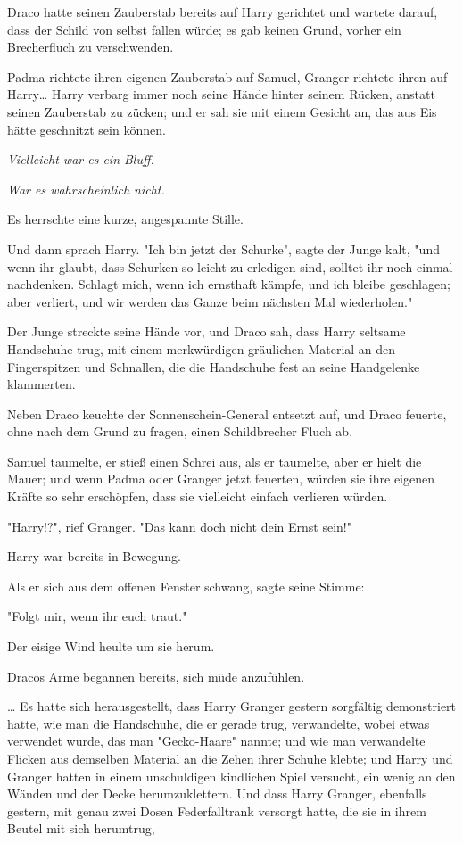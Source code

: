 {Draco hatte seinen Zauberstab bereits auf Harry gerichtet und wartete darauf, dass der Schild von selbst fallen würde; es gab keinen Grund, vorher ein Brecherfluch zu verschwenden.

Padma richtete ihren eigenen Zauberstab auf Samuel, Granger richtete ihren auf Harry… Harry verbarg immer noch seine Hände hinter seinem Rücken, anstatt seinen Zauberstab zu zücken; und er sah sie mit einem Gesicht an, das aus Eis hätte geschnitzt sein können.

\emph{Vielleicht war es ein Bluff.}

\emph{War es wahrscheinlich nicht.}

Es herrschte eine kurze, angespannte Stille.

Und dann sprach Harry. "Ich bin jetzt der Schurke", sagte der Junge kalt, "und wenn ihr glaubt, dass Schurken so leicht zu erledigen sind, solltet ihr noch einmal nachdenken. Schlagt mich, wenn ich ernsthaft kämpfe, und ich bleibe geschlagen; aber verliert, und wir werden das Ganze beim nächsten Mal wiederholen."

Der Junge streckte seine Hände vor, und Draco sah, dass Harry seltsame Handschuhe trug, mit einem merkwürdigen gräulichen Material an den Fingerspitzen und Schnallen, die die Handschuhe fest an seine Handgelenke klammerten.

Neben Draco keuchte der Sonnenschein-General entsetzt auf, und Draco feuerte, ohne nach dem Grund zu fragen, einen Schildbrecher Fluch ab.

Samuel taumelte, er stieß einen Schrei aus, als er taumelte, aber er hielt die Mauer; und wenn Padma oder Granger jetzt feuerten, würden sie ihre eigenen Kräfte so sehr erschöpfen, dass sie vielleicht einfach verlieren würden.

"Harry!?", rief Granger. "Das kann doch nicht dein Ernst sein!"

Harry war bereits in Bewegung.

Als er sich aus dem offenen Fenster schwang, sagte seine Stimme:

"Folgt mir, wenn ihr euch traut."

Der eisige Wind heulte um sie herum.

Dracos Arme begannen bereits, sich müde anzufühlen.

… Es hatte sich herausgestellt, dass Harry Granger gestern sorgfältig demonstriert hatte, wie man die Handschuhe, die er gerade trug, verwandelte, wobei etwas verwendet wurde, das man "Gecko-Haare" nannte; und wie man verwandelte Flicken aus demselben Material an die Zehen ihrer Schuhe klebte; und Harry und Granger hatten in einem unschuldigen kindlichen Spiel versucht, ein wenig an den Wänden und der Decke herumzuklettern. Und dass Harry Granger, ebenfalls gestern, mit genau zwei Dosen Federfalltrank versorgt hatte, die sie in ihrem Beutel mit sich herumtrug,

}
